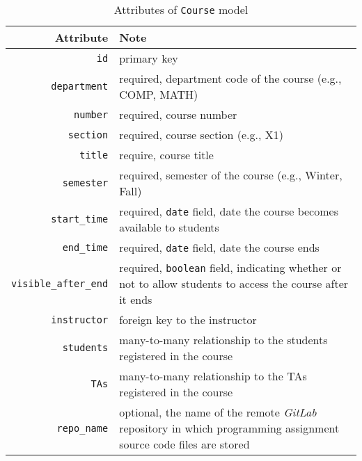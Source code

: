 \begin{table}[h]
    \centering
    \caption{Attributes of \texttt{Course} model}
    \label{tab:COURSE_ATTR}
    \renewcommand{\arraystretch}{1.3}
    \begin{tabular}[ht]{r|p{4in}}
        \hline
        Attribute & Note \\
        \hline
        \hline
        \texttt{id} & primary key \\
        \hline
        \texttt{department} & required, department code of the course
            (e.g., COMP, MATH) \\
        \hline
        \texttt{number} & required, course number \\
        \hline
        \texttt{section} & required, course section (e.g., X1) \\
        \hline
        \texttt{title} & require, course title \\
        \hline
        \texttt{semester} & required, semester of the course
            (e.g., Winter, Fall) \\
        \hline
        \texttt{start\_time} & required, \texttt{date} field, date the course
            becomes available to  students \\
        \hline
        \texttt{end\_time} & required, \texttt{date} field, date the course
            ends \\
        \hline
        \texttt{visible\_after\_end} & required, \texttt{boolean} field,
            indicating whether or not to allow students to access the course
            after it ends \\
        \hline
        \hline

        \texttt{instructor} & foreign key to the instructor \\
        \hline
        \texttt{students} & many-to-many relationship to the students
            registered in the course\\
        \hline
        \texttt{TAs} & many-to-many relationship to the TAs registered in the
            course \\

        \hline
        \hline

        \texttt{repo\_name} & optional, the name of the remote \emph{GitLab}
            repository  in 
            which programming assignment source code files  are stored \\
        \hline
        \hline


\end{tabular}
\end{table}
